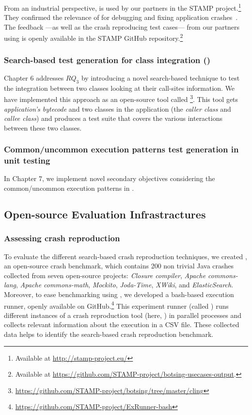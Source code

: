 From an industrial perspective, \botsing is used by our partners in the STAMP project.\footnote{Available at \url{http://stamp-project.eu/}}
They confirmed the relevance of \botsing for debugging and fixing application crashes~\cite{D57}.
The feedback ---as well as the crash reproducing test cases--- from our partners using \botsing is openly available in the STAMP GitHub repository.\footnote{Available at \url{https://github.com/STAMP-project/botsing-usecases-output}.}

\subsubsection{Search-based test generation for class integration (\cling)}
Chapter 6 addresses $RQ_3$ by introducing a novel search-based technique to test the integration between two classes looking at their call-sites information. We have implemented this approach as an open-source tool called \cling\footnote{\url{https://github.com/STAMP-project/botsing/tree/master/cling}}. This tool gets \emph{application's bytecode} and two classes in the application (the \emph{caller class} and \emph{callee class}) and produces a test suite that covers the various interactions between these two classes.

\subsubsection{Common/uncommon execution patterns test generation in unit testing}
In Chapter 7, we implement novel secondary objectives considering the common/uncommon execution patterns in \evosuite.

\subsection{Open-source Evaluation Infrastractures}

\subsubsection{Assessing crash reproduction}
To evaluate the different search-based crash reproduction techniques, we created \jcrashpack, an open-source crash benchmark, which contains 200 non trivial Java crashes collected from seven open-source projects: \textit{Closure compiler}, \textit{Apache commons-lang}, \textit{Apache commons-math}, \textit{Mockito}, \textit{Joda-Time}, \textit{XWiki}, and \textit{ElasticSearch}.
Moreover, to ease benchmarking using \crashpack, we developed a bash-based execution runner, openly available on GitHub.\footnote{\url{https://github.com/STAMP-project/ExRunner-bash}} This experiment runner (called \exrunner) runs different instances of a crash reproduction tool (here, \botsing) in parallel processes and collects relevant information about the execution in a CSV file. These collected data helps to identify the search-based crash reproduction benchmark.

